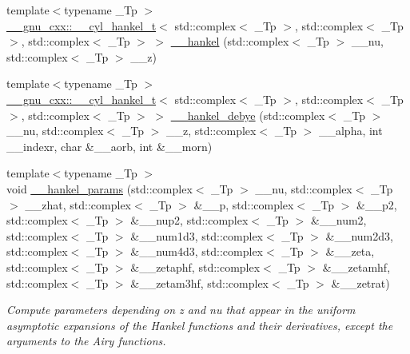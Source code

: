 \begin{DoxyCompactItemize}
{\footnotesize template$<$typename \+\_\+\+Tp $>$ }\\\hyperlink{struct____gnu__cxx_1_1____cyl__hankel__t}{\+\_\+\+\_\+gnu\+\_\+cxx\+::\+\_\+\+\_\+cyl\+\_\+hankel\+\_\+t}$<$ std\+::complex$<$ \+\_\+\+Tp $>$, std\+::complex$<$ \+\_\+\+Tp $>$, std\+::complex$<$ \+\_\+\+Tp $>$ $>$ \hyperlink{namespacestd_1_1____detail_a0346301fb5eb7faa659064335675f8c6}{\+\_\+\+\_\+hankel} (std\+::complex$<$ \+\_\+\+Tp $>$ \+\_\+\+\_\+nu, std\+::complex$<$ \+\_\+\+Tp $>$ \+\_\+\+\_\+z)
\item 
{\footnotesize template$<$typename \+\_\+\+Tp $>$ }\\\hyperlink{struct____gnu__cxx_1_1____cyl__hankel__t}{\+\_\+\+\_\+gnu\+\_\+cxx\+::\+\_\+\+\_\+cyl\+\_\+hankel\+\_\+t}$<$ std\+::complex$<$ \+\_\+\+Tp $>$, std\+::complex$<$ \+\_\+\+Tp $>$, std\+::complex$<$ \+\_\+\+Tp $>$ $>$ \hyperlink{namespacestd_1_1____detail_a4051efdcdf6d1ab4a4b26c1c9f6752b6}{\+\_\+\+\_\+hankel\+\_\+debye} (std\+::complex$<$ \+\_\+\+Tp $>$ \+\_\+\+\_\+nu, std\+::complex$<$ \+\_\+\+Tp $>$ \+\_\+\+\_\+z, std\+::complex$<$ \+\_\+\+Tp $>$ \+\_\+\+\_\+alpha, int \+\_\+\+\_\+indexr, char \&\+\_\+\+\_\+aorb, int \&\+\_\+\+\_\+morn)
\item 
{\footnotesize template$<$typename \+\_\+\+Tp $>$ }\\void \hyperlink{namespacestd_1_1____detail_aff42671a79cd3852a57752f79c82f8da}{\+\_\+\+\_\+hankel\+\_\+params} (std\+::complex$<$ \+\_\+\+Tp $>$ \+\_\+\+\_\+nu, std\+::complex$<$ \+\_\+\+Tp $>$ \+\_\+\+\_\+zhat, std\+::complex$<$ \+\_\+\+Tp $>$ \&\+\_\+\+\_\+p, std\+::complex$<$ \+\_\+\+Tp $>$ \&\+\_\+\+\_\+p2, std\+::complex$<$ \+\_\+\+Tp $>$ \&\+\_\+\+\_\+nup2, std\+::complex$<$ \+\_\+\+Tp $>$ \&\+\_\+\+\_\+num2, std\+::complex$<$ \+\_\+\+Tp $>$ \&\+\_\+\+\_\+num1d3, std\+::complex$<$ \+\_\+\+Tp $>$ \&\+\_\+\+\_\+num2d3, std\+::complex$<$ \+\_\+\+Tp $>$ \&\+\_\+\+\_\+num4d3, std\+::complex$<$ \+\_\+\+Tp $>$ \&\+\_\+\+\_\+zeta, std\+::complex$<$ \+\_\+\+Tp $>$ \&\+\_\+\+\_\+zetaphf, std\+::complex$<$ \+\_\+\+Tp $>$ \&\+\_\+\+\_\+zetamhf, std\+::complex$<$ \+\_\+\+Tp $>$ \&\+\_\+\+\_\+zetam3hf, std\+::complex$<$ \+\_\+\+Tp $>$ \&\+\_\+\+\_\+zetrat)
\begin{DoxyCompactList}\small\item\em Compute parameters depending on z and nu that appear in the uniform asymptotic expansions of the Hankel functions and their derivatives, except the arguments to the Airy functions. \end{DoxyCompactList}\item 

\end{DoxyCompactItemize}
